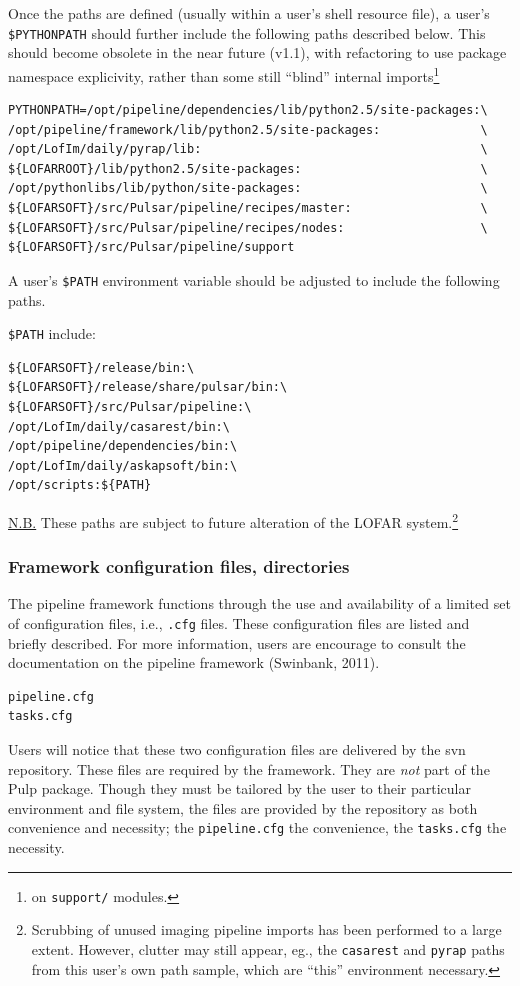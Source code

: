 \documentclass[a4paper,10pt,bibtotoc]{scrartcl}
\begin{document}
Once the paths are defined (usually within a user's shell resource file),
a user's \verb|$PYTHONPATH| should further include the following paths
described below.  This should become obsolete in the near future
(v1.1), with refactoring to use package namespace explicivity, rather
than some still ``blind'' internal imports\footnote{on \texttt{support/} modules.}

\begin{verbatim}
PYTHONPATH=/opt/pipeline/dependencies/lib/python2.5/site-packages:\
/opt/pipeline/framework/lib/python2.5/site-packages:              \ 
/opt/LofIm/daily/pyrap/lib:                                       \
${LOFARROOT}/lib/python2.5/site-packages:                         \
/opt/pythonlibs/lib/python/site-packages:                         \
${LOFARSOFT}/src/Pulsar/pipeline/recipes/master:                  \
${LOFARSOFT}/src/Pulsar/pipeline/recipes/nodes:                   \
${LOFARSOFT}/src/Pulsar/pipeline/support 
\end{verbatim}

A user's \verb|$PATH| environment variable should be adjusted to include the following paths.

\verb|$PATH| include:
\begin{verbatim}
${LOFARSOFT}/release/bin:\ 
${LOFARSOFT}/release/share/pulsar/bin:\
${LOFARSOFT}/src/Pulsar/pipeline:\ 
/opt/LofIm/daily/casarest/bin:\ 
/opt/pipeline/dependencies/bin:\ 
/opt/LofIm/daily/askapsoft/bin:\ 
/opt/scripts:${PATH} 
\end{verbatim}
\underline{N.B.} These paths are subject to future alteration of the LOFAR system.\footnote{Scrubbing of unused imaging pipeline imports has been performed to a large extent. However, clutter may still appear, eg., the \texttt{casarest} and \texttt{pyrap} paths from this user's own path sample, which are ``this'' environment necessary.}

\subsubsection{Framework configuration files, directories}
\label{sec:cfgfiles}
The pipeline framework functions through the use and availability of a limited set of configuration files, i.e., \verb|.cfg| files.  These configuration files are listed and briefly described.  For more information, users are encourage to consult the documentation on the pipeline framework (Swinbank, 2011).\\

\begin{verbatim}
pipeline.cfg
tasks.cfg
\end{verbatim}
Users will notice that these two configuration files are delivered by
the svn repository.  These files are required by the framework.  They
are \emph{not} part of the Pulp package. Though they must be tailored by the
user to their particular environment and file system, the files are
provided by the repository as both convenience and necessity; the
\verb|pipeline.cfg| the convenience, the \verb|tasks.cfg| the necessity.
\end{document}
